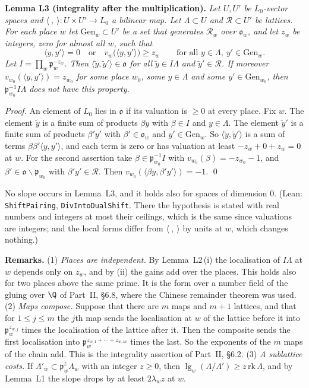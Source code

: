 \documentclass[11pt,letterpaper]{article}
\begin{document}
\textbf{Lemma L3 (integrality after the multiplication).} \emph{Let $U,U'$ be $L_0$-vector spaces and
$\langle\ ,\ \rangle:U\times U'\to L_0$ a bilinear map. Let $\Lambda\subset U$ and
$\mathcal R\subset U'$ be lattices. For each place $w$ let $\mathrm{Gen}_w\subset U'$ be a set that
generates $\mathcal R_w$ over $\mathfrak o_w$, and let $z_w$ be integers, zero for almost all $w$, such
that}
\begin{equation}\label{lt:val}
 \langle y,y'\rangle=0\quad\text{or}\quad v_w\big(\langle y,y'\rangle\big)\ge z_w
 \qquad\text{for all }y\in\Lambda,\ y'\in\mathrm{Gen}_w .
\end{equation}
\emph{Let $I=\prod_w\mathfrak p_w^{-z_w}$. Then $\langle\tilde y,\tilde y'\rangle\in\mathfrak o$ for all
$\tilde y\in I\Lambda$ and $\tilde y'\in\mathcal R$. If moreover $v_{w_0}(\langle y,y'\rangle)=z_{w_0}$ for
some place $w_0$, some $y\in\Lambda$ and some $y'\in\mathrm{Gen}_{w_0}$, then
$\mathfrak p_{w_0}^{-1}I\Lambda$ does not have this property.}

\emph{Proof.} An element of $L_0$ lies in $\mathfrak o$ if its valuation is $\ge0$ at every place. Fix
$w$. The element $\tilde y$ is a finite sum of products $\beta y$ with $\beta\in I$ and $y\in\Lambda$. The
element $\tilde y'$ is a finite sum of products $\beta'y'$ with $\beta'\in\mathfrak o_w$ and
$y'\in\mathrm{Gen}_w$. So $\langle\tilde y,\tilde y'\rangle$ is a sum of terms
$\beta\beta'\langle y,y'\rangle$, and each term is zero or has valuation at least $-z_w+0+z_w=0$ at $w$.
For the second assertion take $\beta\in\mathfrak p_{w_0}^{-1}I$ with $v_{w_0}(\beta)=-z_{w_0}-1$, and
$\beta'\in\mathfrak o\smallsetminus\mathfrak p_{w_0}$ with $\beta'y'\in\mathcal R$. Then
$v_{w_0}(\langle\beta y,\beta'y'\rangle)=-1$. \qed

\noindent No slope occurs in Lemma~L3, and it holds also for spaces of dimension $0$.
(Lean: \texttt{ShiftPairing}, \texttt{DivIntoDualShift}. There the hypothesis is stated with real
numbers and integers at most their ceilings, which is the same since valuations are integers; and the
local forms differ from $\langle\ ,\ \rangle$ by units at $w$, which changes nothing.)

\textbf{Remarks.} (1) \emph{Places are independent.} By Lemma~L2\,(i) the localisation of $I\Lambda$ at $w$
depends only on $z_w$, and by (ii) the gains add over the places. This holds also for two places above the
same prime. It is the form over a number field of the gluing over $\Q$ of Part~II, \S6.8, where the Chinese
remainder theorem was used. (2) \emph{Maps compose.} Suppose that there are $m$ maps and $m+1$ lattices,
and that for $1\le j\le m$ the $j$th map sends the localisation at $w$ of the lattice before it into
$\mathfrak p_w^{z_{w,j}}$ times the localisation of the lattice after it. Then the composite sends the
first localisation into $\mathfrak p_w^{z_{w,1}+\cdots+z_{w,m}}$ times the last. So the exponents of the
$m$ maps of the chain add. This is the integrality assertion of Part~II, \S6.2. (3) \emph{A sublattice
costs.} If $\Lambda'_w\subset\mathfrak p_w^{z}\Lambda_w$ with an integer $z\ge0$, then
$\lg_w(\Lambda/\Lambda')\ge z\,\mathrm{rk}\,\Lambda$, and by Lemma~L1 the slope drops by at least
$2\lambda_wz$ at $w$.
\end{document}
